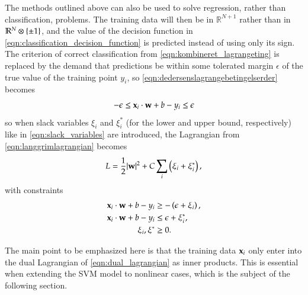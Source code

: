 The methods outlined above can also be used to solve regression, rather than classification, problems\cite{Smola2004}. The training data will then be in $\mathbb{R}^{N+1}$ rather than in $\mathbb{R}^N \otimes \left\{ \pm1 \right\}$, and the value of the decision function in \eqref{eqn:classification_decision_function} is predicted instead of using only its sign. The criterion of correct classification from \eqref{eqn:kombineret_lagrangeting} is replaced by the demand that predictions be within some tolerated margin $\epsilon$ of the true value of the training point $y_i$, so \eqref{eqn:dedersenslagrangebetingelserder} becomes
\begin{equation}
	-\epsilon \leq \mathbf{x}_i\cdot\mathbf{w} + b - y_i \leq \epsilon
\end{equation}
so when slack variables $\xi_i$ and $\xi^{*}_i$ (for the lower and upper bound, respectively) like in \eqref{eqn:slack_variables} are introduced, the Lagrangian from \eqref{eqn:langgrimlagrangian} becomes
\begin{equation}
	L = \frac{1}{2} |\mathbf{w}|^2 + C \sum_{i}\left( \xi_i + \xi^{*}_i \right),
\end{equation}
with constraints
\begin{align}
	\mathbf{x}_i\cdot\mathbf{w} + b - y_i &\geq -\left( \epsilon + \xi_i \right), \\
	\mathbf{x}_i\cdot\mathbf{w} + b - y_i &\leq \epsilon + \xi^{*}_i, \\
	\xi_i, \xi^{*} &\geq 0.
\end{align} 


The main point to be emphasized here is that the training data $\mathbf{x}_i$ only enter into the dual Lagrangian of \eqref{eqn:dual_lagrangian} as inner products. This is essential when extending the SVM model to nonlinear cases, which is the subject of the following section.


